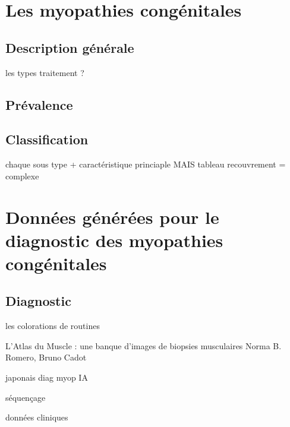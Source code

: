 \section{Les myopathies congénitales}

\subsection{Description générale}
les types
traitement ?

\subsection{Prévalence}
\subsection{Classification}
chaque sous type + caractéristique princiaple
MAIS tableau recouvrement = complexe

\section{Données générées pour le diagnostic des myopathies congénitales}
\subsection{Diagnostic}
les colorations de routines

L’Atlas du Muscle : une banque d’images
de biopsies musculaires
Norma B. Romero, Bruno Cadot

japonais diag myop IA

séquençage

données cliniques
